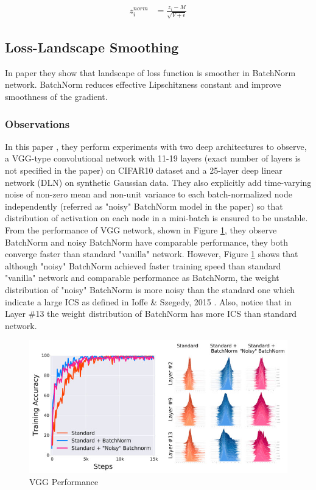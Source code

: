 \documentclass{article}
\begin{document}
\begin{align*}
    z_i^{norm}& = \frac{z_i-M}{\sqrt{V+\epsilon}}
\end{align*}


\subsection{Loss-Landscape Smoothing} \label{landsmooth}
In paper \cite{landscape} they show that landscape of loss function is smoother in BatchNorm network. BatchNorm reduces effective Lipschitzness constant and improve smoothness of the gradient.

\subsubsection{Observations}

In this paper \cite{landscape}, they perform experiments with two deep architectures to observe, a VGG-type convolutional network with 11-19 layers (exact number of layers is not specified in the paper) on CIFAR10 dataset and a 25-layer deep linear network (DLN) on synthetic Gaussian data. They also explicitly add time-varying noise of non-zero mean and non-unit variance to each batch-normalized node independently (referred as "noisy" BatchNorm model in the paper) so that distribution of activation on each node in a mini-batch is ensured to be unstable. From the performance of VGG network, shown in Figure \ref{fig:vgg}, they observe BatchNorm and noisy BatchNorm have comparable performance, they both converge faster than standard "vanilla" network. However, Figure \ref{fig:vgg} shows that although "noisy" BatchNorm achieved faster training speed than standard "vanilla" network and comparable performance as BatchNorm, the weight distribution of "noisy" BatchNorm  is more noisy than the standard one which indicate a large ICS as defined in Ioffe \& Szegedy, 2015 \cite{batchnorm}. Also, notice that in Layer \#13 the weight distribution of BatchNorm has more ICS than standard network.

\begin{figure}[h] 
	\centering
    \includegraphics[scale=0.6]{pics/batchNorm/Santurkar_fig2.jpg}
	\caption{VGG Performance}
	\label{fig:vgg}
\end{figure}
\end{document}
